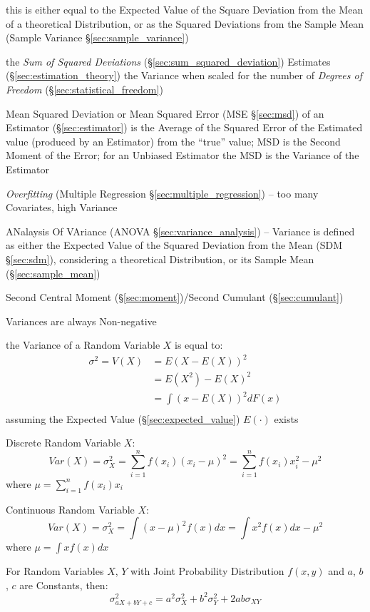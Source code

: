 this is either equal to the Expected Value of the Square Deviation from the
Mean of a theoretical Distribution, or as the Squared Deviations from the Sample
Mean (Sample Variance \S\ref{sec:sample_variance})

the \emph{Sum of Squared Deviations} (\S\ref{sec:sum_squared_deviation})
Estimates (\S\ref{sec:estimation_theory}) the Variance when scaled for the
number of \emph{Degrees of Freedom} (\S\ref{sec:statistical_freedom})

\fist Mean Squared Deviation or Mean Squared Error (MSE \S\ref{sec:msd}) of an
Estimator (\S\ref{sec:estimator}) is the Average of the Squared Error of the
Estimated value (produced by an Estimator) from the ``true'' value; MSD is
the Second Moment of the Error; for an Unbiased Estimator the MSD is the
Variance of the Estimator

\emph{Overfitting} (Multiple Regression \S\ref{sec:multiple_regression}) -- too
many Covariates, high Variance

\fist ANalaysis Of VAriance (ANOVA \S\ref{sec:variance_analysis}) --
Variance is defined as either the Expected Value of the
Squared Deviation from the Mean (SDM \S\ref{sec:sdm}), considering a theoretical
Distribution, or its Sample Mean (\S\ref{sec:sample_mean})

Second Central Moment (\S\ref{sec:moment})/Second Cumulant
(\S\ref{sec:cumulant})

Variances are always Non-negative

the Variance of a Random Variable $X$ is equal to:
\begin{align*}
  \sigma^2 = V(X) & = E(X - E(X))^2   \\
                  & = E(X^2) - E(X)^2 \\
                  & = \int(x - E(X))^2 dF(x) \\
\end{align*}
assuming the Expected Value (\S\ref{sec:expected_value}) $E(\cdot)$ exists

Discrete Random Variable $X$:
\[
  Var(X) = \sigma_X^2 = \sum_{i=1}^n f(x_i) (x_i - \mu)^2 = \sum_{i=1}^n
  f(x_i) x_i^2 - \mu^2
\]
where $\mu = \sum_{i=1}^n f(x_i) x_i$

Continuous Random Variable $X$:
\[
  Var(X) = \sigma_X^2 = \int (x - \mu)^2 f(x) dx = \int x^2 f(x) dx -
  \mu^2
\]
where $\mu = \int x f(x) dx$

For Random Variables $X$, $Y$ with Joint Probability Distribution
$f(x,y)$ and $a$, $b$, $c$ are Constants, then:
\[
  \sigma^2_{a X + b Y + c} = a^2 \sigma^2_X + b^2 \sigma^2_Y + 2ab
  \sigma_{X Y}
\]


